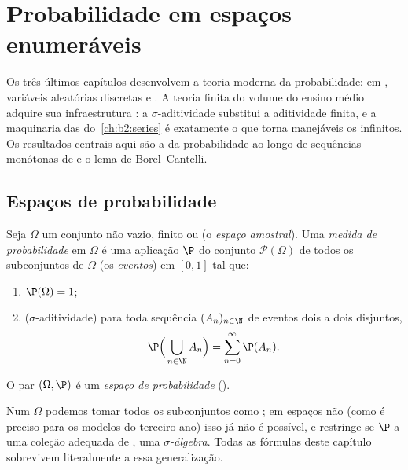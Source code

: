 \chapter{Probabilidade em espaços enumeráveis}\label{ch:b2:proba}

Os três últimos capítulos desenvolvem a teoria moderna da probabilidade:
 em 
, variáveis aleatórias discretas e . A
teoria finita do volume do ensino médio adquire sua
infraestrutura : a $\sigma$-aditividade substitui a aditividade finita,
e a maquinaria das  do~\cref{ch:b2:series} é
exatamente o que torna manejáveis os  infinitos. Os
resultados centrais aqui são a  da probabilidade ao longo de
sequências monótonas de  e o lema de Borel--Cantelli.

\section{Espaços de probabilidade}

\begin{definition}\label{def:b2:proba:space}
Seja $\Omega$ um conjunto não vazio, finito ou  (o
\emph{espaço amostral}). Uma \emph{medida de
probabilidade} em $\Omega$ é
uma aplicação $\P$ do conjunto $\mathcal{P}(\Omega)$ de todos os subconjuntos de
$\Omega$ (os \emph{eventos}) em $[0, 1]$ tal que:
\begin{enumerate}
\item $\P(\Omega) = 1$;
\item ($\sigma$-aditividade) para toda sequência $(A_n)_{n\in\N}$ de
eventos dois a dois disjuntos,
\[
\P\Bigl(\,\bigcup_{n \in \N} A_n\Bigr)
= \sum_{n=0}^{\infty} \P(A_n) .
\]
\end{enumerate}
O par $(\Omega, \P)$ é um \emph{espaço de
probabilidade} ().
\end{definition}

\begin{remark}
Num $\Omega$  podemos tomar todos os subconjuntos como ; em
espaços não  (como é preciso para os modelos  do terceiro ano)
isso já não é possível, e restringe-se $\P$ a uma coleção
adequada de , uma \emph{$\sigma$-álgebra}. Todas as fórmulas
deste capítulo sobrevivem literalmente a essa generalização.
\end{remark}

